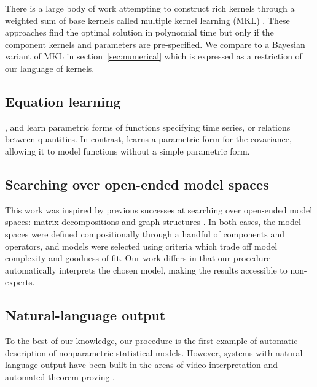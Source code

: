 There is a large body of work attempting to construct rich kernels through a weighted sum of base kernels called multiple kernel learning (MKL) \citep[e.g.][]{bach2004multiple}.
These approaches find the optimal solution in polynomial time but only if the component kernels and parameters are pre-specified.
We compare to a Bayesian variant of MKL in section~\ref{sec:numerical} which is expressed as a restriction of our language of kernels.

\subsection{Equation learning}
\cite{todorovski1997declarative}, \cite{washio1999discovering} and \cite{schmidt2009distilling} learn parametric forms of functions specifying time series, or relations between quantities.
In contrast, \procedurename{} learns a parametric form for the covariance, allowing it to model functions without a simple parametric form.


\subsection{Searching over open-ended model spaces}

This work was inspired by previous successes at searching over open-ended model spaces: matrix decompositions \citep{grosse2012exploiting} and graph structures \citep{kemp2008discovery}.
In both cases, the model spaces were defined compositionally through a handful of components and operators, and models were selected using criteria which trade off model complexity and goodness of fit.
Our work differs in that our procedure automatically interprets the chosen model, making the results accessible to non-experts.

\subsection{Natural-language output}
To the best of our knowledge, our procedure is the first example of automatic description of nonparametric statistical models.
However, systems with natural language output have been built in the areas of video interpretation \citep{barbu2012video} and automated theorem proving \citep{GanesalingamG13}.






